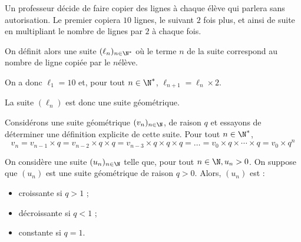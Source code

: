 \documentclass[10pt,openright,twoside,french]{book}
\begin{document}
\begin{Exemple}
    Un professeur décide de faire copier des lignes à chaque élève qui parlera sans autorisation. Le premier copiera $10$ lignes, le suivant $2$ fois plus, et ainsi de suite en multipliant le nombre de lignes par $2$ à chaque fois.\par
    On définit alors une suite $(\ell_n)_{n\in\N^*}$ où le terme $n$ de la suite correspond au nombre de ligne copiée par le $n$\ieme élève.\par
    On a donc $\ell_1 = 10$ et, pour tout $n \in \N^*$, $\ell_{n+1} = \ell_n \times 2$.\par
    La suite $(\ell_n)$ est donc une suite géométrique.

    \begin{center}
\end{center}
\end{Exemple}\medskip

\begin{Rmq}
    Considérons une suite géométrique $(v_n)_{n \in \N}$, de raison $q$ et essayons de déterminer une définition explicite de cette suite. Pour tout $n \in \N^*$,
    \[v_{n} = v_{n-1} \times q = v_{n-2} \times q \times q = v_{n-3} \times q \times q \times q = \ldots = v_0 \times q \times \cdots \times q = v_0 \times q^n\]
\end{Rmq}\medskip

\begin{Thm}
    On considère une suite $(u_n)_{n\in\N}$ telle que, pour tout $n \in \N, u_n > 0$.
    On suppose que $(u_n)$ est une suite géométrique de raison $q > 0$. Alors, $(u_n)$ est :
    \begin{itemize}
        \item croissante si $q > 1$ ;
        \item décroissante si $q < 1$ ;
        \item constante si $q = 1$.
    \end{itemize}
\end{Thm}
\end{document}
